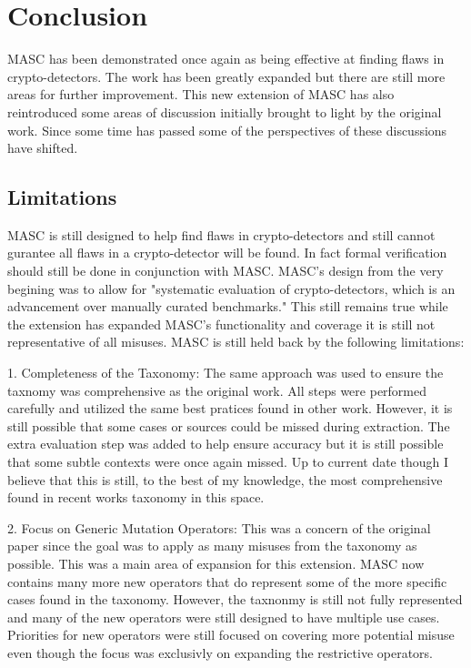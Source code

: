 \chapter{Conclusion}
\label{chap_conclusion}

MASC has been demonstrated once again as being effective at finding flaws in crypto-detectors. The work has been greatly expanded but there are still more areas for further improvement. This new extension of MASC has also reintroduced some areas of discussion initially brought to light by the original work. Since some time has passed some of the perspectives of these discussions have shifted.

\section{Limitations}
\label{ch6:sec:limitations}

MASC is still designed to help find flaws in crypto-detectors and still cannot gurantee all flaws in a crypto-detector will be found. In fact formal verification should still be done in conjunction with MASC. MASC's design from the very begining was to allow for "systematic evaluation of crypto-detectors, which is an advancement over manually curated benchmarks." This still remains true while the extension has expanded MASC's functionality and coverage it is still not representative of all misuses. MASC is still held back by the following limitations:

1. Completeness of the Taxonomy: The same approach was used to ensure the taxnomy was comprehensive as the original work. All steps were performed carefully and utilized the same best pratices found in other work. However, it is still possible that some cases or sources could be missed during extraction. The extra evaluation step was added to help ensure accuracy but it is still possible that some subtle contexts were once again missed. Up to current date though I believe that this is still, to the best of my knowledge, the most comprehensive found in recent works taxonomy in this space.

2. Focus on Generic Mutation Operators: This was a concern of the original paper since the goal was to apply as many misuses from the taxonomy as possible. This was a main area of expansion for this extension. MASC now contains many more new operators that do represent some of the more specific cases found in the taxonomy. However, the taxnonmy is still not fully represented and many of the new operators were still designed to have multiple use cases. Priorities for new operators were still focused on covering more potential misuse even though the focus was exclusivly on expanding the restrictive operators.

